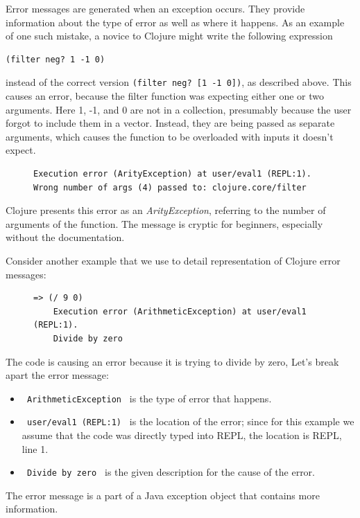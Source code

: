 \documentclass[12pt]{article}
\newcommand{\comment}[1]{{\bf \tt  {#1}}}
\newcommand{\emcomment}[1]{\textcolor{ForestGreen}{\comment{Elena: {#1}}}}
\newcommand{\tkcomment}[1]{\textcolor{Teal}{\comment{Tristan: {#1}}}}
\begin{document}
   Error messages are generated when an exception occurs. They provide information about
   the type of error as well as where it happens. 
As an example of one such mistake, a novice to Clojure might write the following expression
\begin{verbatim}
(filter neg? 1 -1 0)
\end{verbatim}
instead of the correct version \texttt{(filter neg? [1 -1 0])}, as described above.
This causes an error, because the filter function was expecting either one or two arguments. 
Here 1, -1, and 0 are not in a collection, presumably because the user forgot to include them in a vector. 
 Instead, they are being passed as separate arguments, which causes the function to be overloaded with inputs it doesn't expect.

 \begin{figure}[h]
	\centering
	\begin{lstlisting}[breaklines=true, basicstyle=\ttfamily]
Execution error (ArityException) at user/eval1 (REPL:1).
Wrong number of args (4) passed to: clojure.core/filter
	\end{lstlisting}
\end{figure}
 Clojure presents this error as an {\it ArityException}, referring to the number of arguments of the function. 
 The message is cryptic for beginners, especially without the documentation.

Consider another example that we use to detail representation of Clojure error messages: 
	\begin{figure}[h]
		\centering
		\begin{lstlisting}[breaklines=true, basicstyle=\ttfamily]
	=> (/ 9 0)
	Execution error (ArithmeticException) at user/eval1 (REPL:1).
	Divide by zero
		\end{lstlisting}
	\end{figure}

The code is causing an error because it is trying to divide by zero, Let's break apart the error message:
	\begin{itemize}
		\item \texttt{ ArithmeticException } is the type of error that happens.
		\item \texttt{ user/eval1 (REPL:1) } is the location of the error; since for this example we assume that the code was directly typed into REPL, the location is REPL, line 1. 
		\item \texttt{ Divide by zero } is the given description for the cause of the error.
	\end{itemize}
The error message is a part of a Java exception object that contains more information. 
\end{document}
